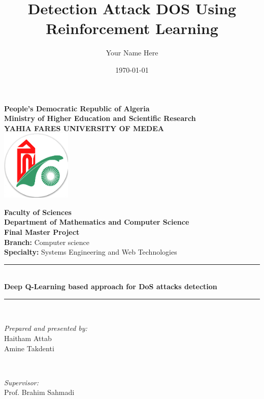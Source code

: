 \documentclass[16pt]{report}
\title{\Huge{\textbf{Detection Attack DOS Using Reinforcement Learning}}}
\author{Your Name Here}
\date{\today}
\begin{document}
\begin{center}
    \textbf{\LARGE People’s Democratic Republic of Algeria}\\[0.2cm]
    \textbf{\large Ministry of Higher Education and Scientific Research}\\[0.2cm]
    \textbf{\Large YAHIA FARES UNIVERSITY OF MEDEA}\\[1cm]

    \includegraphics[width=0.25\textwidth]{./images/univ_logo.png}\par\vspace{1.5cm}

    \textbf{\Large Faculty of Sciences}\\[0.5cm]
    \textbf{Department of Mathematics and Computer Science}\\[1cm]

    \textbf{\Huge Final Master Project}\\[1.2cm]

    \textbf{\large Branch:} Computer science\\[0.3cm]
    \textbf{\large Specialty:} Systems Engineering and Web Technologies\\[1cm]

    \rule{\linewidth}{0.5mm} \\[0.4cm]
    { \Huge \bfseries Deep Q-Learning based approach for DoS attacks detection \\[0.4cm] }
    \rule{\linewidth}{0.5mm} \\[1.5cm]

    \begin{minipage}{0.4\textwidth}
        \begin{flushleft} \large
            \emph{Prepared and presented by:}\\
            Haitham Attab \\
            Amine Takdenti
        \end{flushleft}
    \end{minipage}~
    \begin{minipage}{0.4\textwidth}
        \begin{flushright} \large
            \emph{Supervisor:}\\
            Prof. Brahim Sahmadi
        \end{flushright}
    \end{minipage}\\[2cm]
\end{center}
\end{document}
